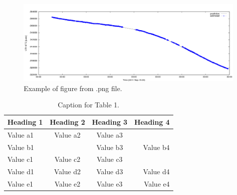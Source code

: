 \documentclass[twocolumn,twoside]{svmultivs_br} %
\begin{document}
%
\begin{figure}[htb!]
\begin{center}
\includegraphics[width=16.0cm]{ivs-br-template02.png}
\end{center}
\caption{Example of figure from .png file.}
\label{second-unique-label}
\end{figure}
%
%
\begin{table}[htb!]
\caption{Caption for Table 1.}
\begin{center}
\begin{tabular}{|l|c|c|r|} \hline
Heading 1 & Heading 2 & Heading 3 & Heading 4\\
\hline
Value a1 & Value a2 & Value a3 &          \\
Value b1 &          & Value b3 & Value b4 \\
Value c1 & Value c2 & Value c3 &          \\
Value d1 & Value d2 & Value d3 & Value d4 \\
Value e1 & Value e2 & Value e3 & Value e4 \\
\hline
\end{tabular}
\end{center}
\label{third-unique-label}
\end{table}
%
\end{document}
